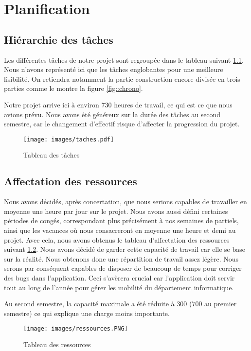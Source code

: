 \chapter{Planification}

\section{Hiérarchie des tâches}
Les différentes tâches de notre projet sont regroupée dans le tableau suivant \ref{fig::taches}. Nous n'avons représenté ici que les tâches englobantes pour une meilleure lisibilité. On retiendra notamment la partie construction encore divisée en trois parties comme le montre la figure \ref{fig::chrono}.

Notre projet arrive ici à environ 730 heures de travail, ce qui est ce que nous avions prévu. Nous avons été généreux sur la durée des tâches au second semestre, car le changement d'effectif risque d'affecter la progression du projet.

\begin{figure}[H]
	\centering
	\texttt{[image: images/taches.pdf]}
	\caption{Tableau des tâches}
	\label{fig::taches}
\end{figure}

\section{Affectation des ressources}
Nous avons décidés, après concertation, que nous serions capables de travailler en moyenne une heure par jour sur le projet. Nous avons aussi défini certaines périodes de congés, correspondant plus précisément à nos semaines de partiels, ainsi que les vacances où nous consacreront en moyenne une heure et demi au projet. Avec cela, nous avons obtenus le tableau d'affectation des ressources suivant \ref{fig::ressources}. Nous avons décidé de garder cette capacité de travail car elle se base sur la réalité. Nous obtenons donc une répartition de travail assez légère. Nous serons par conséquent capables de disposer de beaucoup de temps pour corriger des bugs dans l'application. Ceci s'avèrera crucial car l'application doit servir tout au long de l'année pour gérer les mobilité du département informatique.

Au second semestre, la capacité maximale a été réduite à 300  (700 au premier semestre) ce qui explique une charge moins importante.

\begin{figure}[H]
	\centering
	\texttt{[image: images/ressources.PNG]}
	\caption{Tableau des ressources}
	\label{fig::ressources}
\end{figure}

